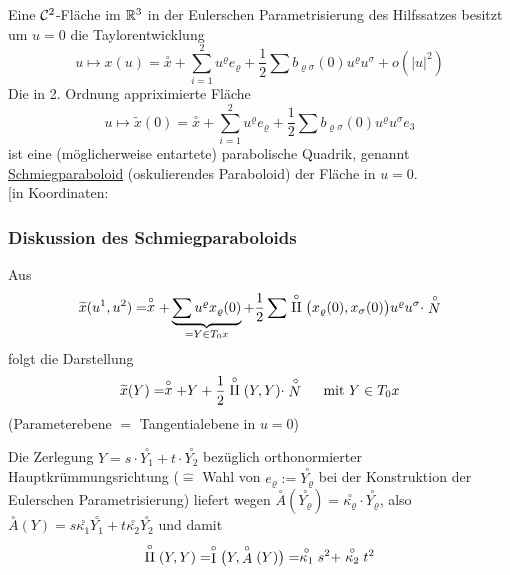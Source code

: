 \begin{satz}\label{satz233}
 Eine \(\mathcal{C}^2\)-Fläche im \(\mathbb{R}^3\) in der Eulerschen Parametrisierung des Hilfssatzes besitzt um \(u = 0\) die Taylorentwicklung
 \[
  u \mapsto x(u) = \stackrel \circ x + \sum_{i=1}^2 u^\varrho e_\varrho + \frac12 \sum b_{\varrho \sigma}(0) u^\varrho u^\sigma + o\left(|u|^2\right)
 \]
 Die in 2. Ordnung appriximierte Fläche
 \[
  u \mapsto \widetilde x(0) = \stackrel \circ x + \sum_{i=1}^2 u^\varrho e_\varrho + \frac12 \sum b_{\varrho \sigma}(0) u^\varrho u^\sigma e_3
 \]
 ist eine (möglicherweise entartete) parabolische Quadrik, genannt \uline{Schmiegparaboloid} (oskulierendes Paraboloid) der Fläche in \(u = 0\). \\
 {\Huge[}in Koordinaten: \mat{2x^3 = \sum_{\varrho, \sigma = 1}^2 b_{\varrho \sigma}(0) x^\varrho x^\sigma}{\Huge]}
\end{satz}

\subsubsection*{Diskussion des Schmiegparaboloids}
Aus 
\begin{align*}
 \widetilde x(u^1, u^2) = \stackrel \circ x + \underbrace{\sum u^\varrho x_\varrho (0)}_{= Y \in T_0 x} + \frac12 \sum \stackrel \circ {\Rom2} \big( x_\varrho(0), x_\sigma(0)\big) u^\varrho u^\sigma \cdot \stackrel \circ N
\end{align*}
folgt die Darstellung
\begin{align*}
 \widetilde x(Y) = \stackrel \circ x + Y + \frac12\stackrel \circ {\Rom2}(Y,Y) \cdot \stackrel \circ N \quad \text{ mit } Y \in T_0 x
\end{align*}
(Parameterebene \(=\) Tangentialebene in \(u = 0\)) \par
Die Zerlegung \(Y = s \cdot \stackrel \circ{Y_1} + t \cdot \stackrel \circ{Y_2}\) bezüglich orthonormierter Hauptkrümmungsrichtung (\(\widehat=\) Wahl von \(e_\varrho := \stackrel \circ{Y_\varrho}\) bei der Konstruktion der Eulerschen Parametrisierung) liefert wegen \(\stackrel \circ A \left(\stackrel \circ{Y_\varrho}\right) = \stackrel \circ {\kappa_\varrho} \cdot \stackrel \circ{Y_\varrho}\), also \(\stackrel \circ A(Y) = s \stackrel \circ{\kappa_1} \stackrel \circ {Y_1} + t \stackrel \circ{\kappa_2} \stackrel \circ {Y_2}\) und damit
\[
 \stackrel \circ {\Rom2} (Y,Y) = \stackrel \circ {\Rom1}\big(Y, \stackrel \circ A(Y)\big) = \stackrel \circ {\kappa_1} s^2 + \stackrel \circ {\kappa_2} t^2
\]

